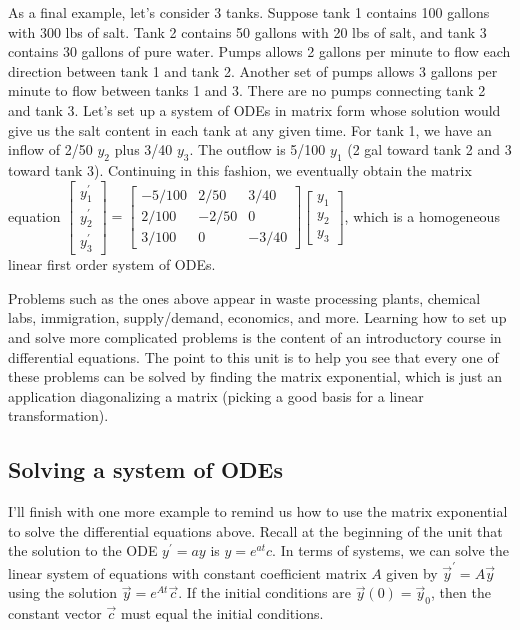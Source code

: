 \documentclass[10pt]{article}
\theoremstyle{plain}
\theoremstyle{box}
\begin{document}
As a final example, let's consider 3 tanks.  Suppose tank 1 contains 100 gallons with 300 lbs of salt.  Tank 2 contains 50 gallons with 20 lbs of salt, and tank 3 contains 30 gallons of pure water.  Pumps allows 2 gallons per minute to flow each direction between tank 1 and tank 2.  Another set of pumps allows 3 gallons per minute to flow between tanks 1 and 3.  There are no pumps connecting tank 2 and tank 3. Let's set up a system of ODEs in matrix form whose solution would give us the salt content in each tank at any given time.  For tank 1, we have an inflow of 2/50 $y_2$ plus 3/40 $y_3$. The outflow is 5/100 $y_1$ (2 gal toward tank 2 and 3 toward tank 3).  Continuing in this fashion, we eventually obtain the matrix equation
$
\begin{bmatrix}
y_1^\prime\\
y_2^\prime\\
y_3^\prime
\end{bmatrix}
=
\begin{bmatrix}
-5/100&2/50 &3/40\\
2/100 &-2/50&0\\
3/100 &0    &-3/40
\end{bmatrix}
\begin{bmatrix}
y_1\\
y_2\\
y_3
\end{bmatrix}
$, which is a homogeneous linear first order system of ODEs.

Problems such as the ones above appear in waste processing plants, chemical labs, immigration, supply/demand, economics, and more. Learning how to set up and solve more complicated problems is the content of an introductory course in differential equations.  The point to this unit is to help you see that every one of these problems can be solved by finding the matrix exponential, which is just an application diagonalizing a matrix (picking a good basis for a linear transformation).


\subsection{Solving a system of ODEs}
I'll finish with one more example to remind us how to use the matrix exponential to solve the differential equations above.  Recall at the beginning of the unit that the solution to the ODE 
 $y^\prime =a y$ is $y=e^{at}c$. In terms of systems, we can solve the linear system of equations with constant coefficient matrix $A$ given by $\vec y^\prime =A \vec y$ using the solution
$\vec y=e^{At}\vec c.$ If the initial conditions are $\vec y(0)=\vec y_0$, then the constant vector $\vec c$ must equal the initial conditions.
\end{document}
